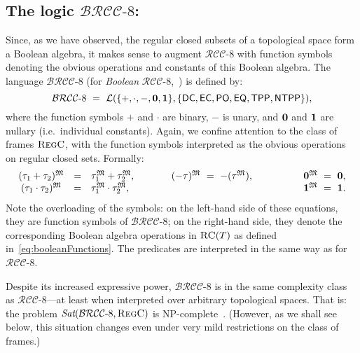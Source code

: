 \documentclass{LMCS}
\theoremstyle{plain}
\newcommand{\BRCCE}{\ensuremath{\mathcal{BRCC}\text{-}8}}
\newcommand{\RCCE}{\ensuremath{\mathcal{RCC}\text{-}8}}\newcommand{\RCCEcc}{\ensuremath{\RCCE{}cc}}\newcommand{\RCCEc}{\ensuremath{\RCCE{}c}}
\newcommand{\Sat}{\textit{Sat}}
\newcommand{\Regc}{\textsc{RegC}}
\newcommand{\NP}{\textsc{NP}}
\begin{document}
\subsection*{The logic $\BRCCE$:}
Since, as we have observed, the regular closed subsets of a
topological space form a Boolean algebra, it makes sense to augment
$\RCCE$ with function symbols denoting the obvious operations and
constants of this Boolean algebra. The language $\BRCCE$ (for {\em
Boolean} $\RCCE$,~\cite{Wolter&Z00ecai}) is defined by:
\begin{equation*}
\BRCCE ~=~ \cL(\{+, \cdot, -, \zero, \one \},
\{\mathsf{DC}, \mathsf{EC}, \mathsf{PO}, \mathsf{EQ}, \mathsf{TPP}, \mathsf{NTPP}\}),
\end{equation*}
where the function symbols $+$ and $\cdot$ are binary, $-$ is unary,
and $\mathbf{0}$ and $\mathbf{1}$ are nullary (i.e.~individual constants).  Again, we
confine attention to the class of frames $\Regc$, with the
function symbols interpreted as the obvious operations on regular
closed sets. Formally:
\begin{equation*}
\begin{array}{cllll}
(\tau_1 + \tau_2)^{\mathfrak{M}} &= &\tau_1^{\mathfrak{M}} + \tau_2^{\mathfrak{M}}, \hspace{1cm} &
(-\tau)^{\mathfrak{M}} ~=~ -(\tau^{\mathfrak{M}}), \hspace{1.5cm} &
\mathbf{0}^{\mathfrak{M}} ~=~ \mathbf{0},\\
(\tau_1 \cdot \tau_2)^{\mathfrak{M}} &= &\tau_1^{\mathfrak{M}} \cdot \tau_2^{\mathfrak{M}}, &
& \mathbf{1}^{\mathfrak{M}} ~=~ \mathbf{1}.
\end{array}
\end{equation*}
Note the overloading of the symbols: on the left-hand side of these
equations, they are function symbols of $\BRCCE$; on the right-hand
side, they denote the corresponding Boolean algebra operations in
$\textsc{RC}(T)$ as defined in~\eqref{eq:booleanFunctions}. The predicates
are interpreted in the same way as for $\RCCE$.



Despite its increased expressive power, $\BRCCE$ is in the same
complexity class as $\RCCE$---at least when interpreted over arbitrary
topological spaces. That is: the problem
$\Sat(\BRCCE,\Regc)$ is
\NP-complete~\cite{Wolter&Z00ecai}. (However, as we shall see below,
this situation changes even under very mild restrictions on the class
of frames.)
\end{document}
